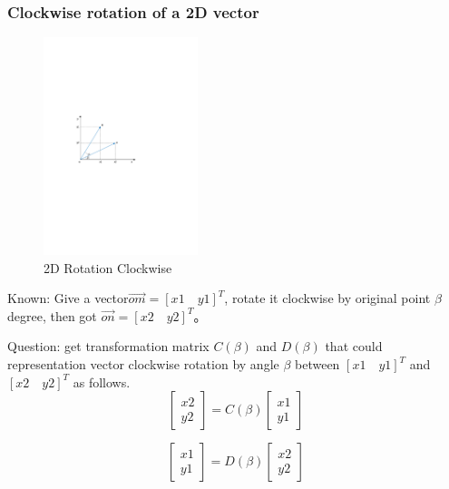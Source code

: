 \documentclass{article} %
\numberwithin{equation}{section} %
\begin{document}
\subsubsection{Clockwise rotation of a 2D vector}

\begin{figure}[htbp]
\centering
\includegraphics[width=0.40\textwidth]{derive_2d_rotation_matrix_clockwise.pdf}
\caption{2D Rotation Clockwise}
\end{figure}

Known: Give a vector$\overrightarrow{om}=[x1\quad y1]^T$, rotate it clockwise by original point $\beta$ degree, then got $\overrightarrow{on}=[x2\quad y2]^T$。

Question: get transformation matrix $C(\beta)$ and $D(\beta)$ that could representation vector clockwise rotation by angle $\beta$ between  $[x1\quad y1]^T$ and $[x2\quad y2]^T$ as follows.
\begin{equation}
\begin{bmatrix}x2\\y2\end{bmatrix}=C(\beta)\begin{bmatrix}x1\\y1\end{bmatrix}
\end{equation}

\begin{equation}
\begin{bmatrix}x1\\y1\end{bmatrix}=D(\beta)\begin{bmatrix}x2\\y2\end{bmatrix}
\end{equation}
\end{document}
